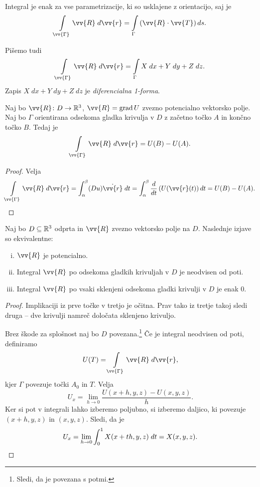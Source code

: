 \begin{opomba}
Integral je enak za vse parametrizacije, ki so usklajene z
orientacijo, saj je
\[
\lint_{\vv{\Gamma}} \vv{R}\;d\vv{r} =
\lint_\Gamma \left(\vv{R} \cdot \vv{T}\right)ds.
\]
\end{opomba}

\begin{opomba}
Pišemo tudi
\[
\lint_{\vv{\Gamma}} \vv{R}\;d\vv{r} =
\lint_\Gamma X\;dx + Y\;dy + Z\;dz.
\]
Zapis $X\;dx + Y\;dy + Z\;dz$ je \emph{diferencialna 1-forma}.
\end{opomba}

\begin{trditev}
Naj bo $\vv{R} \colon D \to \R^3$, $\vv{R} = \grad U$ zvezno
potencialno vektorsko polje. Naj bo $\Gamma$ orientirana odsekoma
gladka krivulja v $D$ z začetno točko $A$ in končno točko $B$.
Tedaj je
\[
\lint_{\vv{\Gamma}} \vv{R}\;d\vv{r} =
U(B) - U(A).
\]
\end{trditev}

\begin{proof}
Velja
\[
\lint_{\vv{\Gamma}} \vv{R}\;d\vv{r} =
\int_\alpha^\beta (Du) \dot{\vv{r}}\;dt =
\int_\alpha^\beta \frac{d}{dt} \left(U(\vv{r}(t)\right)dt =
U(B) - U(A). \qedhere
\]
\end{proof}

\begin{izrek}
Naj bo $D \subseteq \mathbb{R}^3$ odprta in $\vv{R}$ zvezno vektorsko polje
na $D$. Naslednje izjave so ekvivalentne:

\begin{enumerate}[i)]
\item $\vv{R}$ je potencialno.
\item Integral $\vv{R}$ po odsekoma gladkih krivuljah v $D$ je
neodvisen od poti.
\item Integral $\vv{R}$ po vsaki sklenjeni odsekoma gladki krivulji
v $D$ je enak $0$.
\end{enumerate}
\end{izrek}


\begin{proof}
Implikaciji iz prve točke v tretjo je očitna. Prav tako iz tretje
takoj sledi druga -- dve krivulji namreč določata sklenjeno 
krivuljo.

Brez škode za splošnost naj bo $D$ povezana.\footnote{Sledi, da je
povezana s potmi.} Če je integral neodvisen od poti, definiramo
\[
U(T) = \lint_{\vv{\Gamma}} \vv{R}\;d\vv{r},
\]
kjer $\Gamma$ povezuje točki $A_0$ in $T$. Velja
\[
U_x = \lim_{h \to 0} \frac{U(x+h, y, z) - U(x, y, z)}{h}.
\]
Ker si pot v integrali lahko izberemo poljubno, si izberemo
daljico, ki povezuje $(x+h, y, z)$ in $(x, y, z)$. Sledi, da je
\[
U_x =
\lim_{h \to 0} \int_0^1 X(x + th, y, z)\;dt =
X(x, y, z). \qedhere
\]
\end{proof}

